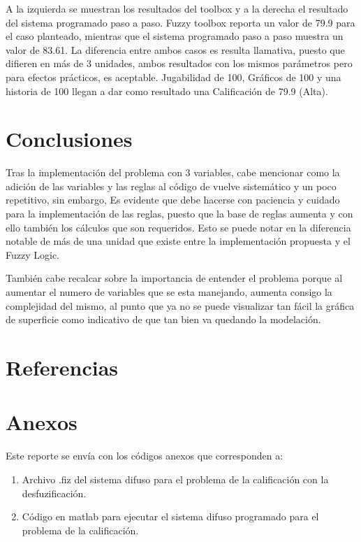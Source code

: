 \documentclass[11pt, letterpaper]{article}
\begin{document}
A la izquierda se muestran los resultados del toolbox y a la derecha el resultado del sistema programado paso a paso. 
Fuzzy toolbox reporta un valor de 79.9 para el caso planteado, mientras que el sistema programado paso a paso muestra un valor de 83.61. La diferencia entre ambos casos es resulta llamativa, puesto que difieren en más de 3 unidades, ambos resultados con los mismos parámetros pero para efectos prácticos, es aceptable. Jugabilidad de 100, Gráficos de 100 y una historia de 100 llegan a dar como resultado una Calificación de 79.9 (Alta).


\newpage

\section{Conclusiones}

Tras la implementación del problema con 3 variables, cabe mencionar como la adición de las variables y las reglas al código de vuelve sistemático y un poco repetitivo, sin embargo, Es evidente que debe hacerse con paciencia y cuidado para la implementación de las reglas, puesto que la base de reglas aumenta y con ello también los cálculos que son requeridos. Esto se puede notar en la diferencia notable de más de una unidad que existe entre la implementación propuesta y el Fuzzy Logic. 

También cabe recalcar sobre la importancia de entender el problema porque al aumentar el numero de variables que se esta manejando, aumenta consigo la complejidad del mismo, al punto que ya no se puede visualizar tan fácil la gráfica de superficie como indicativo de que tan bien va quedando la modelación.



\newpage

\section{Referencias}


\newpage

\section{Anexos}

Este reporte se envía con los códigos anexos que corresponden a:

\begin{enumerate}
	\item Archivo .fiz del sistema difuso para el problema de la calificación con la desfuzificación.
	\item Código en matlab para ejecutar el sistema difuso programado para el problema de la calificación.

\end{enumerate}
\end{document}
